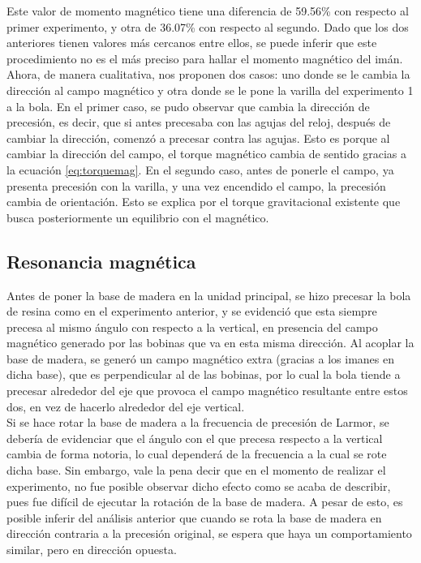 \documentclass[%
 reprint,
 amsmath,amssymb,
 aps,
]{revtex4-1}
\begin{document}
Este valor de momento magnético tiene una diferencia de 59.56\% con respecto al primer experimento, y otra de 36.07\% con respecto al segundo. Dado que los dos anteriores tienen valores más cercanos entre ellos, se puede inferir que este procedimiento no es el más preciso para hallar el momento magnético del imán.\\
Ahora, de manera cualitativa, nos proponen dos casos: uno donde se le cambia la dirección al campo magnético y otra donde se le pone la varilla del experimento 1 a la bola. En el primer caso, se pudo observar que cambia la dirección de precesión, es decir, que si antes precesaba con las agujas del reloj, después de cambiar la dirección, comenzó a precesar contra las agujas. Esto es porque al cambiar la dirección del campo, el torque magnético cambia de sentido gracias a  la ecuación \ref{eq:torquemag}. En el segundo caso, antes de ponerle el campo, ya presenta precesión con la varilla, y una vez encendido el campo, la precesión cambia de orientación. Esto se explica por el torque gravitacional existente que busca posteriormente un equilibrio con el magnético.

\subsection{Resonancia magnética}

Antes de poner la base de madera en la unidad principal, se hizo precesar la bola de resina como en el experimento anterior, y se evidenció que esta siempre precesa al mismo ángulo con respecto a la vertical, en presencia del campo magnético generado por las bobinas que va en esta misma dirección. Al acoplar la base de madera, se generó un campo magnético extra (gracias a los imanes en dicha base), que es perpendicular al de las bobinas, por lo cual la bola tiende a precesar alrededor del eje que provoca el campo magnético resultante entre estos dos, en vez de hacerlo alrededor del eje vertical.\\
Si se hace rotar la base de madera a la frecuencia de precesión de Larmor, se debería de evidenciar que el ángulo con el que precesa respecto a la vertical cambia de forma notoria, lo cual dependerá de la frecuencia a la cual se rote dicha base. Sin embargo, vale la pena decir que en el momento de realizar el experimento, no fue posible observar dicho efecto como se acaba de describir, pues fue difícil de ejecutar la rotación de la base de madera. A pesar de esto, es posible inferir del análisis anterior que cuando se rota la base de madera en dirección contraria a la precesión original, se espera que haya un comportamiento similar, pero en dirección opuesta.
\end{document}
